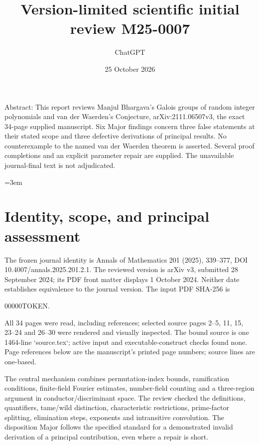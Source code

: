 \documentclass[10pt]{article}
\title{Version-limited scientific initial review
M25-0007}
\author{ChatGPT}
\date{25 October 2026}
\begin{document}
\maketitle
Abstract: This report reviews Manjul Bhargava’s Galois groups of random integer polynomials and van der Waerden’s Conjecture, arXiv:2111.06507v3, the exact 34-page supplied manuscript. Six Major findings concern three false statements at their stated scope and three defective derivations of principal results. No counterexample to the named van der Waerden theorem is asserted. Several proof completions and an explicit parameter repair are supplied. The unavailable journal-final text is not adjudicated.\par
=3em\par
\section*{Identity, scope, and principal assessment}
The frozen journal identity is Annals of Mathematics 201 (2025), 339–377, DOI 10.4007/annals.2025.201.2.1. The reviewed version is arXiv v3, submitted 28 September 2024; its PDF front matter displays 1 October 2024. Neither date establishes equivalence to the journal version. The input PDF SHA-256 is\par
00000TOKEN.\par
All 34 pages were read, including references; selected source pages 2–5, 11, 15, 23–24 and 26–30 were rendered and visually inspected. The bound source is one 1464-line `source.tex`; active input and executable-construct checks found none. Page references below are the manuscript’s printed page numbers; source lines are one-based.\par
The central mechanism combines permutation-index bounds, ramification conditions, finite-field Fourier estimates, number-field counting and a three-region argument in conductor/discriminant space. The review checked the definitions, quantifiers, tame/wild distinction, characteristic restrictions, prime-factor splitting, elimination steps, exponents and intransitive convolution. The disposition Major follows the specified standard for a demonstrated invalid derivation of a principal contribution, even where a repair is short.\par
\end{document}
